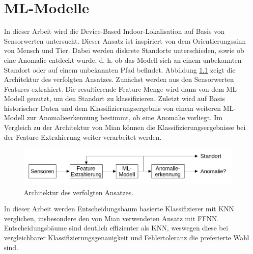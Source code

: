 \chapter{ML-Modelle}
In dieser Arbeit wird die Device-Based Indoor-Lokalisation auf Basis von Sensorwerten untersucht.
Dieser Ansatz ist inspiriert von dem Orientierungssinn von Mensch und Tier.
Dabei werden diskrete Standorte unterschieden, sowie ob eine Anomalie entdeckt wurde,
d. h. ob das Modell sich an einem unbekannten Standort oder auf einem unbekannten Pfad befindet.
\newline
\newline
Abbildung \ref{fig:model_idea} zeigt die Architektur des verfolgten Ansatzes.
Zunächst werden aus den Sensorwerten Features extrahiert.
Die resultierende Feature-Menge wird dann von dem ML-Modell genutzt, um den Standort zu klassifizieren.
Zuletzt wird auf Basis historischer Daten und dem Klassifizierungsergebnis von einem weiteren ML-Modell zur Anomalieerkennung bestimmt, ob eine Anomalie vorliegt.
Im Vergleich zu der Architektur von Mian \cite{naveedThesis} können die Klassifizierungsergebnisse bei der Feature-Extrahierung weiter verarbeitet werden.
\begin{figure}[h!]
    \centering
    \includegraphics[width=\linewidth]{images/model_idea.png}
    \caption{Architektur des verfolgten Ansatzes.}
    \label{fig:model_idea}
\end{figure}
\newline
In dieser Arbeit werden Entscheidungsbaum basierte Klassifizierer mit KNN verglichen, insbesondere den von Mian verwendeten Ansatz mit FFNN.
Entscheidungsbäume sind deutlich effizienter als KNN, weswegen diese bei vergleichbarer Klassifizierungsgenauigkeit und Fehlertoleranz die preferierte Wahl sind.

